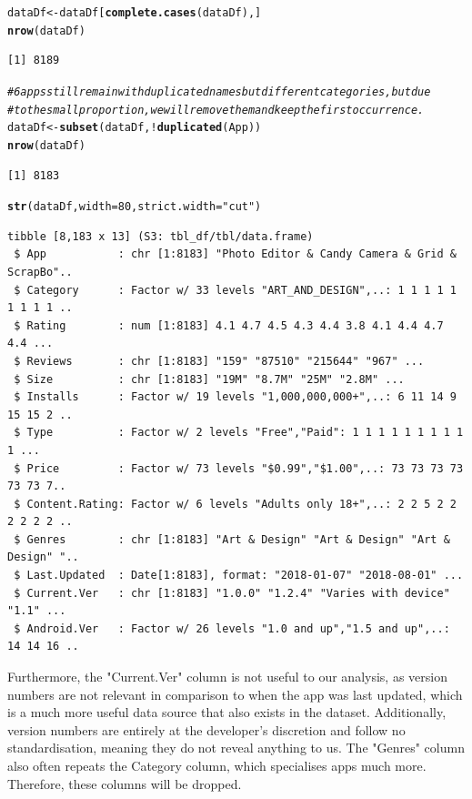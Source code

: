 \documentclass[12pt]{report}\usepackage[]{graphicx}\usepackage[]{xcolor}
\makeatletter
\newcommand{\hlnum}[1]{\textcolor[rgb]{0.686,0.059,0.569}{#1}}%
\newcommand{\hlstr}[1]{\textcolor[rgb]{0.192,0.494,0.8}{#1}}%
\newcommand{\hlcom}[1]{\textcolor[rgb]{0.678,0.584,0.686}{\textit{#1}}}%
\newcommand{\hlopt}[1]{\textcolor[rgb]{0,0,0}{#1}}%
\newcommand{\hlstd}[1]{\textcolor[rgb]{0.345,0.345,0.345}{#1}}%
\newcommand{\hlkwb}[1]{\textcolor[rgb]{0.69,0.353,0.396}{#1}}%
\newcommand{\hlkwc}[1]{\textcolor[rgb]{0.333,0.667,0.333}{#1}}%
\newcommand{\hlkwd}[1]{\textcolor[rgb]{0.737,0.353,0.396}{\textbf{#1}}}%
\newenvironment{kframe}{%
 \def\at@end@of@kframe{}%
 \ifinner\ifhmode%
  \def\at@end@of@kframe{\end{minipage}}%
  \begin{minipage}{\columnwidth}%
 \fi\fi%
 \def\FrameCommand##1{\hskip\@totalleftmargin \hskip-\fboxsep
 \colorbox{shadecolor}{##1}\hskip-\fboxsep
     \hskip-\linewidth \hskip-\@totalleftmargin \hskip\columnwidth}%
 \MakeFramed {\advance\hsize-\width
   \@totalleftmargin\z@ \linewidth\hsize
   \@setminipage}}%
 {\par\unskip\endMakeFramed%
 \at@end@of@kframe}
\newenvironment{knitrout}{}{} %
\makeatother
\begin{document}
\begin{knitrout}\footnotesize
{}\color{fgcolor}\begin{kframe}
\begin{alltt}
\hlstd{dataDf} \hlkwb{<-} \hlstd{dataDf[}\hlkwd{complete.cases}\hlstd{(dataDf), ]}
\hlkwd{nrow}\hlstd{(dataDf)}
\end{alltt}
\begin{verbatim}
[1] 8189
\end{verbatim}
\begin{alltt}
\hlcom{# 6 apps still remain with duplicated names but different categories, but due}
\hlcom{# to the small proportion, we will remove them and keep the first occurrence.}
\hlstd{dataDf} \hlkwb{<-} \hlkwd{subset}\hlstd{(dataDf,} \hlopt{!}\hlkwd{duplicated}\hlstd{(App))}
\hlkwd{nrow}\hlstd{(dataDf)}
\end{alltt}
\begin{verbatim}
[1] 8183
\end{verbatim}
\begin{alltt}
\hlkwd{str}\hlstd{(dataDf,} \hlkwc{width} \hlstd{=} \hlnum{80}\hlstd{,} \hlkwc{strict.width} \hlstd{=} \hlstr{"cut"}\hlstd{)}
\end{alltt}
\begin{verbatim}
tibble [8,183 x 13] (S3: tbl_df/tbl/data.frame)
 $ App           : chr [1:8183] "Photo Editor & Candy Camera & Grid & ScrapBo"..
 $ Category      : Factor w/ 33 levels "ART_AND_DESIGN",..: 1 1 1 1 1 1 1 1 1 ..
 $ Rating        : num [1:8183] 4.1 4.7 4.5 4.3 4.4 3.8 4.1 4.4 4.7 4.4 ...
 $ Reviews       : chr [1:8183] "159" "87510" "215644" "967" ...
 $ Size          : chr [1:8183] "19M" "8.7M" "25M" "2.8M" ...
 $ Installs      : Factor w/ 19 levels "1,000,000,000+",..: 6 11 14 9 15 15 2 ..
 $ Type          : Factor w/ 2 levels "Free","Paid": 1 1 1 1 1 1 1 1 1 1 ...
 $ Price         : Factor w/ 73 levels "$0.99","$1.00",..: 73 73 73 73 73 73 7..
 $ Content.Rating: Factor w/ 6 levels "Adults only 18+",..: 2 2 5 2 2 2 2 2 2 ..
 $ Genres        : chr [1:8183] "Art & Design" "Art & Design" "Art & Design" "..
 $ Last.Updated  : Date[1:8183], format: "2018-01-07" "2018-08-01" ...
 $ Current.Ver   : chr [1:8183] "1.0.0" "1.2.4" "Varies with device" "1.1" ...
 $ Android.Ver   : Factor w/ 26 levels "1.0 and up","1.5 and up",..: 14 14 16 ..
\end{verbatim}
\end{kframe}
\end{knitrout}

Furthermore, the "Current.Ver" column is not useful to our analysis, as version numbers are not 
relevant in comparison to when the app was last updated, which is a much more useful data source that
also exists in the dataset. Additionally, version numbers are entirely at the developer's discretion and 
follow no standardisation, meaning they do not reveal anything to us. The "Genres" column also often repeats
the Category column, which specialises apps much more. Therefore, these columns will be dropped.
\end{document}
